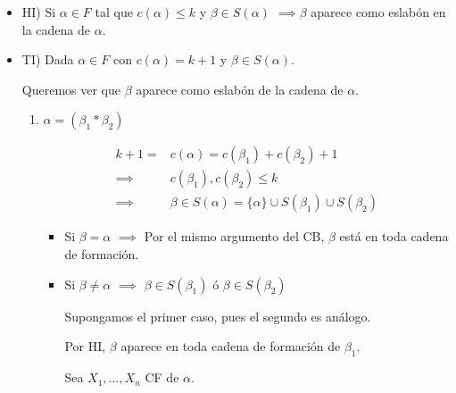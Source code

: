 \begin{itemize}
\begin{itemize}
        \item HI)
            Si $\alpha \in F$ tal que
            $c(\alpha) \leq k$
            y
            $\beta \in S(\alpha)$
            $\implies \beta$ aparece como eslabón en la cadena de $\alpha$.
        \item TI)
            Dada $\alpha \in F$ con
            $c(\alpha) = k + 1$
            y
            $\beta \in S(\alpha)$.

            Queremos ver que $\beta$ aparece como eslabón de la cadena de
            $\alpha$.

            \begin{enumerate}[%
                            labelindent=*,
                            style=multiline,
                            leftmargin=*,
                            align=left,
                            leftmargin=2\parindent,
                            label=Caso \arabic*)]
                \item $\alpha = (\beta_1 * \beta_2)$

                    \begin{align*}
                        k + 1 =& c(\alpha) = c(\beta_1) + c(\beta_2) + 1 \\
                        \implies& c(\beta_1), c(\beta_2) \leq k \\
                        \implies& \beta \in S(\alpha) =
                        \{ \alpha \} \cup S(\beta_1) \cup S(\beta_2)
                    \end{align*}

                    \begin{itemize}
                        \item Si $\beta = \alpha$ $\implies$
                            Por el mismo argumento del CB, $\beta$ está en
                            toda cadena de formación.
                        \item Si $\beta \neq \alpha$ $\implies$
                            $\beta \in S(\beta_1)$ ó $\beta \in S(\beta_2)$

                            Supongamos el primer caso, pues el segundo es
                            análogo.

                            Por HI, $\beta$ aparece en toda cadena de
                            formación de $\beta_1$.

                            Sea $X_1, \dotsc, X_n$ CF de $\alpha$.


\end{itemize}
\end{enumerate}
\end{itemize}
\end{itemize}
